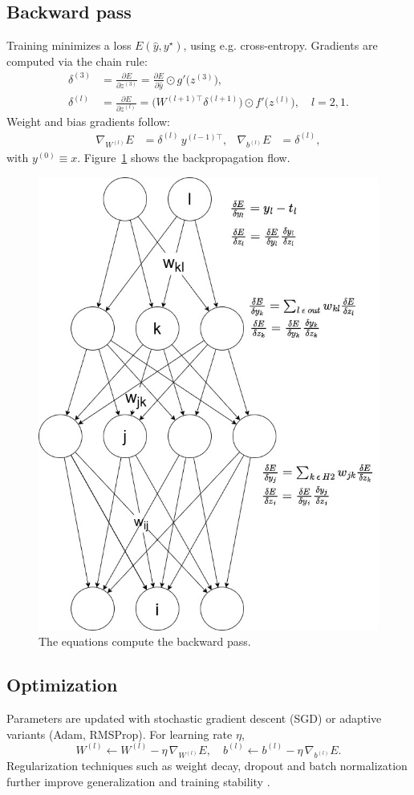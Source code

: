 \subsection{Backward pass}
Training minimizes a loss \(E(\hat y, y^\star)\), using e.g. cross-entropy. Gradients are computed via the chain rule:
\begin{align}
\delta^{(3)} &= \frac{\partial E}{\partial z^{(3)}}
= \frac{\partial E}{\partial \hat y}\odot g'\bigl(z^{(3)}\bigr),\\
\delta^{(l)} &= \frac{\partial E}{\partial z^{(l)}}
= \bigl(W^{(l+1)\top}\delta^{(l+1)}\bigr)\odot f'\bigl(z^{(l)}\bigr),
\quad l=2,1.
\end{align}
Weight and bias gradients follow:
\begin{align}
\nabla_{W^{(l)}}E &= \delta^{(l)}\,y^{(l-1)\top}, &
\nabla_{b^{(l)}}E &= \delta^{(l)},
\end{align}
with \(y^{(0)}\equiv x\). Figure~\ref{fig:backward_pass} shows the backpropagation flow.
\begin{figure}[ht]
    \centering
    \includegraphics[width=0.6\linewidth]{figures/neural_net_back_prop.jpg}
    \caption{The equations compute the backward pass.} 
    \label{fig:backward_pass}
\end{figure}

\subsection{Optimization}
Parameters are updated with stochastic gradient descent (SGD) or adaptive variants (Adam, RMSProp). For learning rate \(\eta\),
\[
W^{(l)} \leftarrow W^{(l)} - \eta\,\nabla_{W^{(l)}}E,
\quad
b^{(l)} \leftarrow b^{(l)} - \eta\,\nabla_{b^{(l)}}E.
\]
Regularization techniques such as weight decay, dropout and batch normalization further improve generalization and training stability \cite{ioffe_batch_2015}.


